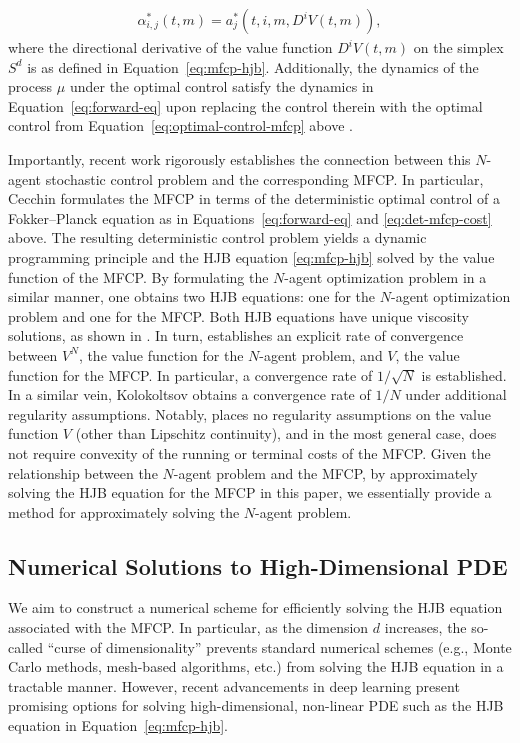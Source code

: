\documentclass[11pt,reqno]{amsart}
\numberwithin{equation}{section}
\theoremstyle{plain}
\begin{document}
\begin{align}
    \label{eq:optimal-control-mfcp}
    \alpha^*_{i,j}(t,m) = a_j^*(t, i,  m, D^i V(t, m)),
\end{align}
where the directional derivative of the value function $D^i V(t, m)$ on the simplex $S^d$ is as defined in Equation~\eqref{eq:mfcp-hjb}. Additionally, the dynamics of the process $\mu$ under the optimal control satisfy the dynamics in Equation~\eqref{eq:forward-eq} upon replacing the control therein with the optimal control from Equation~\eqref{eq:optimal-control-mfcp} above \cite{mfcp}.

Importantly, recent work rigorously establishes the connection between this $N$-agent stochastic control problem and the corresponding MFCP. In particular, Cecchin \cite{mfcp} formulates the MFCP in terms of the deterministic optimal control of a Fokker--Planck equation as in Equations~\eqref{eq:forward-eq} and \eqref{eq:det-mfcp-cost} above. The resulting deterministic control problem yields a dynamic programming principle and the HJB equation \eqref{eq:mfcp-hjb} solved by the value function of the MFCP.  By formulating the $N$-agent optimization problem in a similar manner, one obtains two HJB equations: one for the $N$-agent optimization problem and one for the MFCP. Both HJB equations have unique viscosity solutions, as shown in \cite{mfcp}. In turn, \cite{mfcp} establishes an explicit rate of convergence between $V^N$, the value function for the $N$-agent problem, and $V$, the value function for the MFCP. In particular, a convergence rate of $1/\sqrt{N}$ is established. In a similar vein, Kolokoltsov \cite{kolokoltsov-conv} obtains a convergence rate of $1/N$ under additional regularity assumptions. Notably, \cite{mfcp} places no regularity assumptions on the value function $V$ (other than Lipschitz continuity), and in the most general case, does not require convexity of the running or terminal costs of the MFCP. Given the relationship between the $N$-agent problem and the MFCP, by approximately solving the HJB equation for the MFCP in this paper, we essentially provide a method for approximately solving the $N$-agent problem.

\subsection{Numerical Solutions to High-Dimensional PDE}
\label{subsec:num-sol-hpde}
We aim to construct a numerical scheme for efficiently solving the HJB equation associated with the MFCP. In particular, as the dimension $d$ increases, the so-called ``curse of dimensionality'' prevents standard numerical schemes (e.g., Monte Carlo methods, mesh-based algorithms, etc.) from solving the HJB equation in a tractable manner. However, recent advancements in deep learning present promising options for solving high-dimensional, non-linear PDE such as the HJB equation in Equation~\eqref{eq:mfcp-hjb}.
\end{document}

